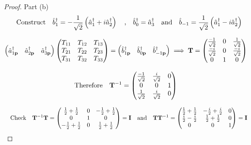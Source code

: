 \documentclass[letterpaper]{article}
\theoremstyle{definition}
\begin{document}
\begin{proof}Part (b)
  \[\qq{Construct}\hat{b}^\dagger_1=-\frac{1}{\sqrt{2}}\left(\hat{a}^\dagger_1+i\hat{a}^\dagger_2\right)\qq{,}\hat{b}^\dagger_0=\hat{a}^\dagger_3\qq{and}\hat{b}_{-1}=\frac{1}{\sqrt{2}}\left(\hat{a}^\dagger_1-i\hat{a}^\dagger_2\right)\]


  \[\begin{pmatrix}
      \hat{a}^\dagger_{1\vb{p}} &
      \hat{a}^\dagger_{2\vb{p}} &
      \hat{a}^\dagger_{3\vb{p}}
    \end{pmatrix}\begin{pmatrix}
      T_{11} & T_{12} & T_{13} \\
      T_{21} & T_{22} & T_{23} \\
      T_{31} & T_{32} & T_{33} \\
    \end{pmatrix}=\begin{pmatrix}
      \hat{b}^\dagger_{1\vb{p}} &
      \hat{b}^\dagger_{0\vb{p}} &
      \hat{b}^\dagger_{-1\vb{p}}
    \end{pmatrix}\implies\vb{T}=\begin{pmatrix}
      \frac{-1}{\sqrt{2}} & 0 & \frac{1}{\sqrt{2}}  \\
      \frac{-i}{\sqrt{2}} & 0 & \frac{-i}{\sqrt{2}} \\
      0                   & 1 & 0                   \\
    \end{pmatrix}\]

  \[\qq*{Therefore}\vb{T}^{-1}=\begin{pmatrix}
      \frac{-1}{\sqrt{2}} & \frac{i}{\sqrt{2}} & 0 \\
      0                   & 0                  & 1 \\
      \frac{1}{\sqrt{2}}  & \frac{i}{\sqrt{2}} & 0 \\
    \end{pmatrix}\]

  \[\qq{Check}\vb{T}^{-1}\vb{T}=\begin{pmatrix}
      \frac{1}{2}+\frac{1}{2}  & 0 & -\frac{1}{2}+\frac{1}{2} \\
      0                        & 1 & 0                        \\
      -\frac{1}{2}+\frac{1}{2} & 0 & \frac{1}{2}+\frac{1}{2}  \\
    \end{pmatrix}=\vb{I}\qand\vb{T}\vb{T}^{-1}=\begin{pmatrix}
      \frac{1}{2}+\frac{1}{2} & -\frac{i}{2}+\frac{i}{2} & 0 \\
      \frac{i}{2}-\frac{i}{2} & \frac{1}{2}+\frac{1}{2}  & 0 \\
      0                       & 0                        & 1 \\
    \end{pmatrix}=\vb{I}\]



\end{proof}
\end{document}

